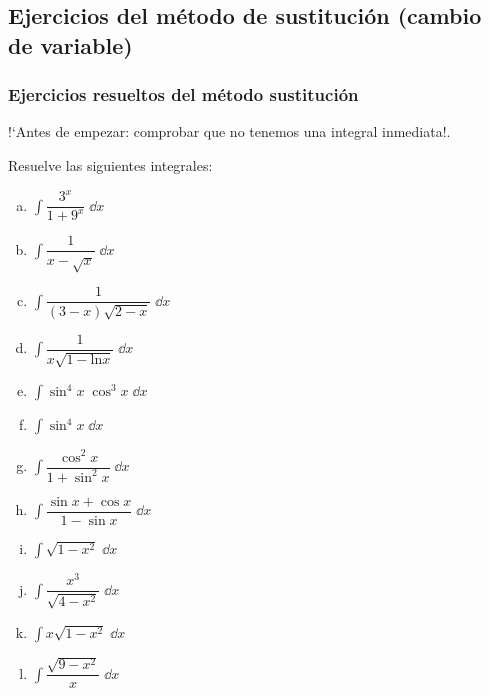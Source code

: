 {\subsection{Ejercicios del método de sustitución (cambio de variable)}

\subsubsection{Ejercicios resueltos del método sustitución}

!`Antes de empezar: comprobar que no tenemos una integral inmediata!. 

\begin{ejer} Resuelve las siguientes integrales:
\begin{multicols}{2}
	
\begin{enumerate}[a) ]

\item $\displaystyle \int \dfrac {3^x}{1+9^x} \; \dd x$

\item $\displaystyle \int \dfrac {1}{x-\sqrt{x}} \; \dd x$

\item $\displaystyle \int \dfrac {1}{(3-x)\sqrt{2-x}} \; \dd x$

\item $\displaystyle \int \dfrac {1}{x\sqrt{1-\mathrm{ln}x}} \; \dd x$ 

\item $\displaystyle \int \sin^4 x \; \cos^3 x \; \dd x$

\item $\displaystyle \int \sin^4 x \; \dd x$

\item $\displaystyle \int \dfrac {\cos^2 x}{1+\sin^2 x} \; \dd x$

\item $\displaystyle \int \dfrac {\sin x + \cos x}{1-\sin x} \; \dd x$

\item $\displaystyle \int \sqrt{1-x^2} \; \dd x$

\item $\displaystyle \int \dfrac{x^3}{\sqrt{4-x^2}} \; \dd x$

\item $\displaystyle \int x\sqrt{1-x^2} \; \dd x$

\item $\displaystyle \int \dfrac{\sqrt{9-x^2}}{x} \; \dd x$


\end{enumerate}
\end{multicols}
\end{ejer}}
